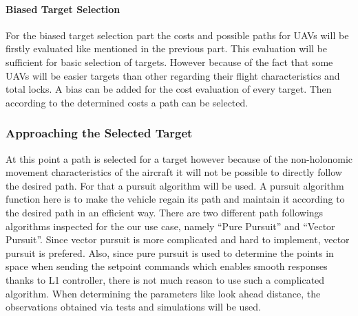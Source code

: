 \documentclass[12pt]{article}
\begin{document}
\paragraph{Biased Target Selection}
For the biased target selection part the costs and possible paths for UAVs will be firstly evaluated like mentioned in the previous part. This evaluation will be sufficient for basic selection of targets. However because of the fact that some UAVs will be easier targets than other regarding their flight characteristics and total locks. A bias can be added for the cost evaluation of every target. Then according to the determined costs a path can be selected.

\subsubsection{Approaching the Selected Target}
At this point a path is selected for a target however because of the non-holonomic movement characteristics of the aircraft it will not be possible to directly follow the desired path. For that a pursuit algorithm will be used. A pursuit algorithm function here is to make the vehicle regain its path and maintain it according to the desired path in an efficient way. 
There are two different path followings algorithms inspected for the our use case, namely “Pure Pursuit” and “Vector Pursuit”. Since vector pursuit is more complicated and hard to implement, vector pursuit is prefered. Also, since pure pursuit is used to determine the points in space when sending the setpoint commands which enables smooth responses thanks to L1 controller, there is not much reason to use such a complicated algorithm.  
When determining the parameters like look ahead distance, the observations obtained via tests and simulations will be used.  
\end{document}

